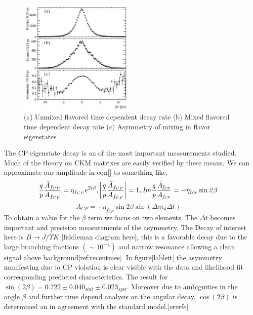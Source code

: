 \documentclass[floatfix,aps,prd,amsmath,amssymb]{revtex4}
\begin{document}
 \begin{figure}[h]
\centering
\includegraphics[width=0.5\textwidth]{figs/Flavourosscilatons.jpg}
\caption{(a) Unmixed flavored time dependent decay rate (b) Mixed flavored time dependent decay rate (c) Asymmetry of mixing in flavor eigenstates}
\label{BBD}
\end{figure}

The CP eigenstate decay is on of the most important measurements studied. Much of the theory on CKM matrixes are easily verified by these means. We can approximate our amplitude in eqn[] to something like,
\[\frac{q}{p}\frac{\bar{A}_{f_{CP}}}{A_{f_{CP}}}=\eta_{f_{CP}}e^{2i\beta}, \left|\frac{q}{p}\frac{\bar{A}_{f_{CP}}}{A_{f_{CP}}}\right|=1, \it{I}m\frac{q}{p}\frac{\bar{A}_{f_{CP}}}{A_{f_{CP}}}=-\eta_{f_{CP}}\sin2\beta\]
\[A_{CP}=-\eta_{f_{CP}}\sin2\beta\sin(\Delta m_d \Delta t)\]
To obtain a value for the $\beta $ term we focus on two elements. The $\Delta t$ becomes important and precision measurements of the asymmetry. The Decay of interest here is $B\rightarrow J/\Upsilon K$ [fiddleman diagram here], this is a favorable decay due to the large branching fractions $(\sim 10^{-4})$ and narrow resonance allowing a clean signal above background[ref:recentmes]. In figure[lableit] the asymmetry manifesting due to CP violation is clear visible with the data and likelihood fit corresponding predicted characteristics. The result for $\sin (2\beta) =0.722\pm 0.040_{stat} \pm0.023_{syst}$. Moreover due to ambiguities in the angle $\beta$  and further time depend analysis on the angular decay, $\cos(2\beta)$ is determined an in agreement with the standard model.[ererfe]
\end{document}
